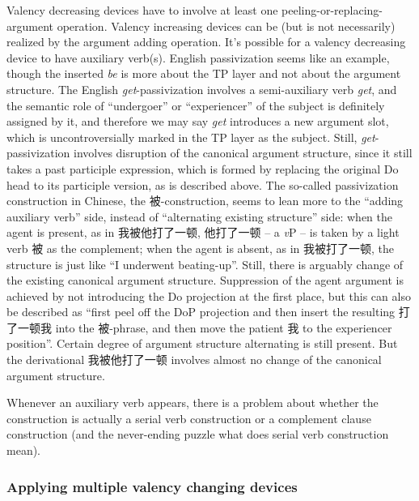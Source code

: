 \documentclass[UTF8, a4paper, oneside, scheme=plain]{ctexart}
\newcommand*{\corpus}[1]{\emph{#1}}
\newcommand*{\vP}{\textit{v}P}
\begin{document}
Valency decreasing devices have to involve at least one peeling-or-replacing-argument operation.
Valency increasing devices can be (but is not necessarily) realized by the argument adding operation.
It's possible for a valency decreasing device to have auxiliary verb(s).
English passivization seems like an example,
though the inserted \corpus{be} is more about the TP layer
and not about the argument structure.
The English \corpus{get}-passivization involves 
a semi-auxiliary verb \corpus{get},
and the semantic role of ``undergoer'' or ``experiencer'' of the subject 
is definitely assigned by it,
and therefore we may say \corpus{get} introduces a new argument slot,
which is uncontroversially marked in the TP layer as the subject.
Still, \corpus{get}-passivization involves 
disruption of the canonical argument structure,
since it still takes a past participle expression,
which is formed by replacing the original Do head to its participle version,
as is described above.
The so-called passivization construction in Chinese,
the 被-construction,
seems to lean more to the ``adding auxiliary verb'' side,
instead of ``alternating existing structure'' side:
when the agent is present,
as in 我被他打了一顿, 
他打了一顿 -- a \vP{} -- is taken by a light verb 被 as the complement;
when the agent is absent,
as in 我被打了一顿,
the structure is just like ``I underwent beating-up''.
Still, there is arguably change of the existing canonical argument structure.
Suppression of the agent argument is achieved by not introducing the Do projection at the first place,
but this can also be described as 
``first peel off the DoP projection and then insert the resulting 打了一顿我 into the 被-phrase,
and then move the patient 我 to the experiencer position''.
Certain degree of argument structure alternating is still present.
But the derivational 我被他打了一顿 involves almost no change of the canonical argument structure.

Whenever an auxiliary verb appears,
there is a problem about whether the construction is actually a serial verb construction
or a complement clause construction 
(and the never-ending puzzle what does serial verb construction mean). %

\subsubsection{Applying multiple valency changing devices}\label{sec:multiple-valency-changing}
\end{document}
